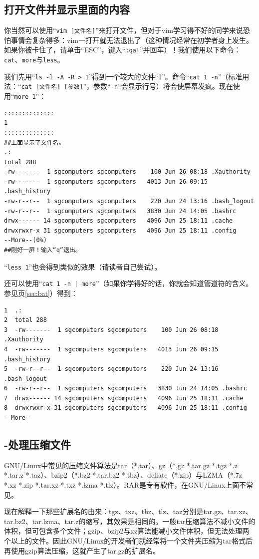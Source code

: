 \subsection{打开文件并显示里面的内容}
你当然可以使用“\verb|vim [文件名]|”来打开文件，但对于vim学习得不好的同学来说恐怕事情会复杂得多：vim一打开就无法退出了（这种情况经常在初学者身上发生。如果你被卡住了，请单击“ESC”，键入“\verb|:qa!|”并回车）！我们使用以下命令：\verb|cat|、\verb|more|与\verb|less|。\par
我们先用“\verb|ls -l -A -R > 1|”得到一个较大的文件“1”。命令“\verb|cat 1 -n|”（标准用法：“\verb|cat [文件名] [参数]|”，参数“\verb|-n|”会显示行号）将会使屏幕发疯。现在使用“\verb|more 1|”：
\begin{verbatim}
::::::::::::::
1
::::::::::::::
##上面显示了文件名。
.:
total 288
-rw-------  1 sgcomputers sgcomputers    100 Jun 26 08:18 .Xauthority
-rw-------  1 sgcomputers sgcomputers   4013 Jun 26 09:15 .bash_history
-rw-r--r--  1 sgcomputers sgcomputers    220 Jun 24 13:16 .bash_logout
-rw-r--r--  1 sgcomputers sgcomputers   3830 Jun 24 14:05 .bashrc
drwx------ 14 sgcomputers sgcomputers   4096 Jun 25 18:11 .cache
drwxrwxr-x 31 sgcomputers sgcomputers   4096 Jun 25 18:11 .config
--More--(0%)
##刚好一屏！输入“q”退出。
\end{verbatim} \par
“\verb|less 1|”也会得到类似的效果（请读者自己尝试）。\par
还可以使用“\verb/cat 1 -n | more/”（如果你学得好的话，你就会知道管道符的含义。参见\pageref{sec:bat}页\ref{sec:bat}）得到：
\begin{verbatim}
1  .:
2  total 288
3  -rw-------  1 sgcomputers sgcomputers    100 Jun 26 08:18 .Xauthority
4  -rw-------  1 sgcomputers sgcomputers   4013 Jun 26 09:15 .bash_history
5  -rw-r--r--  1 sgcomputers sgcomputers    220 Jun 24 13:16 .bash_logout
6  -rw-r--r--  1 sgcomputers sgcomputers   3830 Jun 24 14:05 .bashrc
7  drwx------ 14 sgcomputers sgcomputers   4096 Jun 25 18:11 .cache
8  drwxrwxr-x 31 sgcomputers sgcomputers   4096 Jun 25 18:11 .config
--More--
\end{verbatim}
\subsection{-处理压缩文件}
GNU/Linux中常见的压缩文件算法是tar（*.tar）、gz（*.gz *.tar.gz *.tgz *.z *.tar.z *.taz）、bzip2（*.bz2 *.tar.bz2 *.tbz）、deflate（*.zip）与LZMA（*.7z *.xz *.zip *.tar.xz *.txz *.lzma *.tlz）。RAR是专有软件，在GNU/Linux上面不常见。\par
现在解释一下那些扩展名的由来：tgz、txz、tbz、tlz、taz分别是tar.gz、tar.xz、tar.bz2、tar.lzma、tar.z的缩写，其效果是相同的。一般tar压缩算法不减小文件的体积，但可包含多个文件；gzip、bzip2与xz算法能减小文件体积，但无法处理两个以上的文件。因此GNU/Linux的开发者们就经常将一个文件夹压缩为tar格式后再使用gzip算法压缩，这就产生了tar.gz的扩展名。\par
